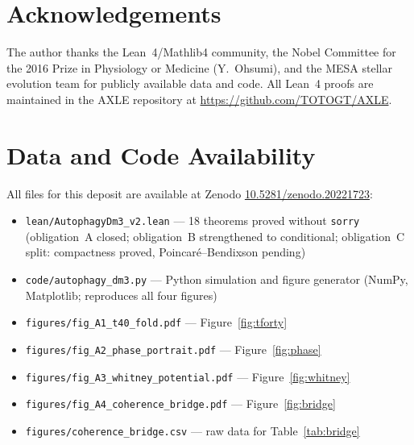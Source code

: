 \documentclass[12pt,a4paper]{article}
\begin{document}
\section*{Acknowledgements}

The author thanks the Lean~4/Mathlib4 community, the Nobel Committee
for the 2016 Prize in Physiology or Medicine (Y.~Ohsumi), and the MESA
stellar evolution team for publicly available data and code.
All Lean~4 proofs are maintained in the AXLE repository \cite{AXLE2026}
at \url{https://github.com/TOTOGT/AXLE}.

\section*{Data and Code Availability}

All files for this deposit are available at Zenodo
\href{https://doi.org/10.5281/zenodo.20221723}{10.5281/zenodo.20221723}:

\begin{itemize}[leftmargin=2em, itemsep=1pt]
  \item \texttt{lean/AutophagyDm3\_v2.lean} --- 18 theorems proved
        without \texttt{sorry} (obligation~A closed; obligation~B
        strengthened to conditional; obligation~C split: compactness
        proved, Poincar\'e--Bendixson pending)
  \item \texttt{code/autophagy\_dm3.py} --- Python simulation and
        figure generator (NumPy, Matplotlib; reproduces all four
        figures)
  \item \texttt{figures/fig\_A1\_t40\_fold.pdf} --- Figure~\ref{fig:tforty}
  \item \texttt{figures/fig\_A2\_phase\_portrait.pdf} --- Figure~\ref{fig:phase}
  \item \texttt{figures/fig\_A3\_whitney\_potential.pdf} --- Figure~\ref{fig:whitney}
  \item \texttt{figures/fig\_A4\_coherence\_bridge.pdf} --- Figure~\ref{fig:bridge}
  \item \texttt{figures/coherence\_bridge.csv} --- raw data for
        Table~\ref{tab:bridge}
\end{itemize}
\end{document}
